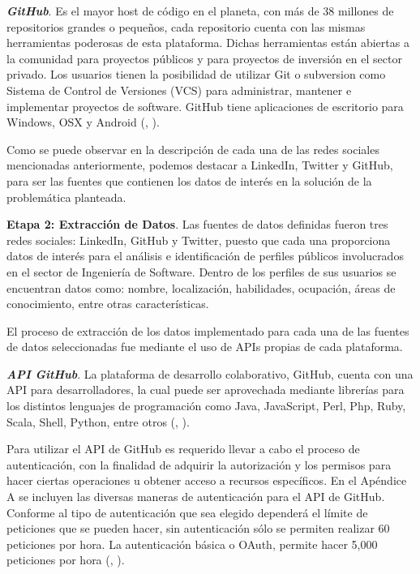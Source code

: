 \textit{\textbf{GitHub}}. Es el mayor host de código en el planeta, con más de 38 millones de repositorios grandes o pequeños, cada repositorio cuenta con las mismas herramientas poderosas de esta plataforma. Dichas herramientas están abiertas a la comunidad para proyectos públicos y para proyectos de inversión en el sector privado. Los usuarios tienen la posibilidad de utilizar Git o subversion como Sistema de Control de Versiones  (VCS) para administrar, mantener e implementar proyectos de software. GitHub tiene aplicaciones de escritorio para Windows, OSX y Android (\citeauthor{github_page}, \citeyear{github_page}).

Como se puede observar en la descripción de cada una de las redes sociales mencionadas anteriormente, podemos destacar a LinkedIn, Twitter y GitHub, para ser las fuentes que contienen los datos de interés en la solución de la problemática planteada. 

\textbf{Etapa 2: Extracción de Datos}. 
Las fuentes de datos definidas fueron tres redes sociales: LinkedIn, GitHub y Twitter, puesto que cada una proporciona datos de interés para el análisis e identificación de perfiles públicos involucrados en el sector de Ingeniería de Software. Dentro de los perfiles de sus usuarios se encuentran datos como: nombre, localización, habilidades, ocupación, áreas de conocimiento, entre otras características.

El proceso de extracción de los datos implementado para cada una de las fuentes de datos seleccionadas fue mediante el uso de APIs propias de cada plataforma.

\textit{\textbf{API GitHub}}. La plataforma de desarrollo colaborativo, GitHub, cuenta con una API para desarrolladores, la cual puede ser aprovechada mediante librerías para los distintos lenguajes de programación como Java, JavaScript, Perl, Php, Ruby, Scala, Shell, Python, entre otros (\citeauthor{ApiGit}, \citeyear{ApiGit}). 


Para utilizar el API de GitHub es requerido llevar a cabo el proceso de autenticación, con la finalidad de adquirir la autorización y los permisos para hacer ciertas operaciones u obtener acceso a recursos específicos. En el Apéndice A se incluyen las diversas maneras de autenticación para el API de GitHub. Conforme al tipo de autenticación que sea elegido dependerá el límite de peticiones que se pueden hacer, sin autenticación sólo se permiten realizar 60 peticiones por hora. La autenticación básica o OAuth, permite hacer 5,000 peticiones por hora (\citeauthor{ratelimit_github}, \citeyear{ratelimit_github}).

